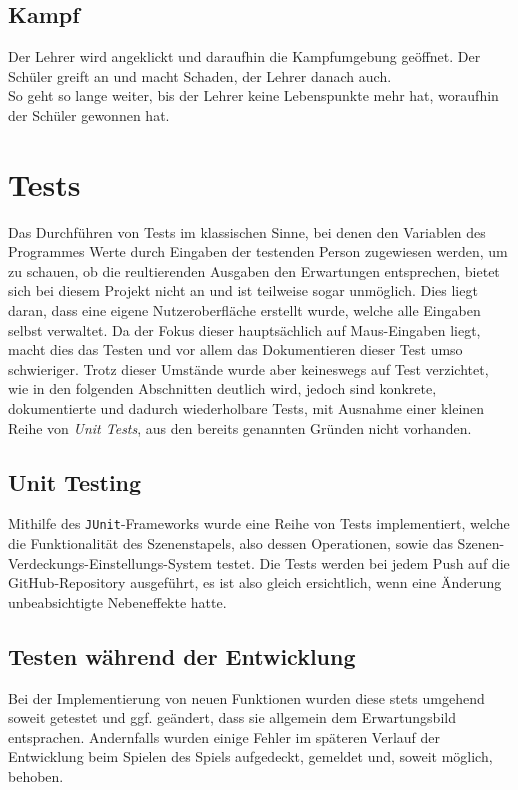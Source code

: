 \subsection{Kampf}

Der Lehrer wird angeklickt und daraufhin die Kampfumgebung geöffnet. Der Schüler greift an und macht Schaden, der Lehrer danach auch.\\
So geht so lange weiter, bis der Lehrer keine Lebenspunkte mehr hat, woraufhin der Schüler gewonnen hat.


\section{Tests}

Das Durchführen von Tests im klassischen Sinne, bei denen den Variablen des Programmes Werte durch Eingaben der testenden Person zugewiesen werden, um zu schauen, ob die reultierenden Ausgaben den Erwartungen entsprechen, bietet sich bei diesem Projekt nicht an und ist teilweise sogar unmöglich.
Dies liegt daran, dass eine eigene Nutzeroberfläche erstellt wurde, welche alle Eingaben selbst verwaltet.
Da der Fokus dieser hauptsächlich auf Maus-Eingaben liegt, macht dies das Testen und vor allem das Dokumentieren dieser Test umso schwieriger.
Trotz dieser Umstände wurde aber keineswegs auf Test verzichtet, wie in den folgenden Abschnitten deutlich wird, jedoch sind konkrete, dokumentierte und dadurch wiederholbare Tests, mit Ausnahme einer kleinen Reihe von \textit{Unit Tests}, aus den bereits genannten Gründen nicht vorhanden.

\subsection{Unit Testing}

Mithilfe des \texttt{JUnit}-Frameworks wurde eine Reihe von Tests implementiert,
welche die Funktionalität des Szenenstapels, also dessen Operationen, sowie das
Szenen-Verdeckungs-Einstellungs-System testet. Die Tests werden bei jedem Push
auf die GitHub-Repository ausgeführt, es ist also gleich ersichtlich, wenn eine
Änderung unbeabsichtigte Nebeneffekte hatte.

\subsection{Testen während der Entwicklung}

Bei der Implementierung von neuen Funktionen wurden diese stets umgehend soweit
getestet und ggf. geändert, dass sie allgemein dem Erwartungsbild entsprachen.
Andernfalls wurden einige Fehler im späteren Verlauf der Entwicklung beim Spielen
des Spiels aufgedeckt, gemeldet und, soweit möglich, behoben.

